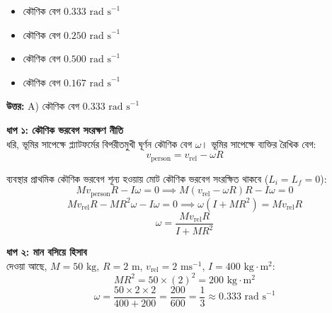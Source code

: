 \documentclass[12pt, a4paper]{article}
\begin{document}
\begin{itemize}[label={}, leftmargin=1cm, itemsep=0.5em]
    \item[\textbf{A)}] কৌণিক বেগ $0.333\text{ rad s}^{-1}$
    \item[\textbf{B)}] কৌণিক বেগ $0.250\text{ rad s}^{-1}$
    \item[\textbf{C)}] কৌণিক বেগ $0.500\text{ rad s}^{-1}$
    \item[\textbf{D)}] কৌণিক বেগ $0.167\text{ rad s}^{-1}$
\end{itemize}

\vspace{0.5em}
\begin{tcolorbox}[answerbox]
    \textbf{\color{success} উত্তর:} A) কৌণিক বেগ $0.333\text{ rad s}^{-1}$
\end{tcolorbox}
\vspace{1em}

\begin{tcolorbox}[solutionbox={সমাধান (Solution)}]
    \noindent
    \textbf{ধাপ ১: কৌণিক ভরবেগ সংরক্ষণ নীতি} \\
    ধরি, ভূমির সাপেক্ষে প্ল্যাটফর্মের বিপরীতমুখী ঘূর্ণন কৌণিক বেগ $\omega$। ভূমির সাপেক্ষে ব্যক্তির রৈখিক বেগ:
    \[ v_{\text{person}} = v_{\text{rel}} - \omega R \]
    
    ব্যবস্থার প্রাথমিক কৌণিক ভরবেগ শূন্য হওয়ায় মোট কৌণিক ভরবেগ সংরক্ষিত থাকবে ($L_i = L_f = 0$):
    \[ M v_{\text{person}} R - I \omega = 0 \implies M (v_{\text{rel}} - \omega R) R - I \omega = 0 \]
    \[ M v_{\text{rel}} R - M R^2 \omega - I \omega = 0 \implies \omega (I + M R^2) = M v_{\text{rel}} R \]
    \[ \omega = \frac{M v_{\text{rel}} R}{I + M R^2} \]
    
    \vspace{0.5em}
    \noindent\textbf{ধাপ ২: মান বসিয়ে হিসাব} \\
    দেওয়া আছে, $M = 50\text{ kg}$, $R = 2\text{ m}$, $v_{\text{rel}} = 2\text{ ms}^{-1}$, $I = 400\text{ kg}\cdot\text{m}^2$:
    \[ M R^2 = 50 \times (2)^2 = 200\text{ kg}\cdot\text{m}^2 \]
    \[ \omega = \frac{50 \times 2 \times 2}{400 + 200} = \frac{200}{600} = \frac{1}{3} \approx \mathbf{0.333}\text{ rad s}^{-1} \]
\end{tcolorbox}

\newpage
\end{document}
